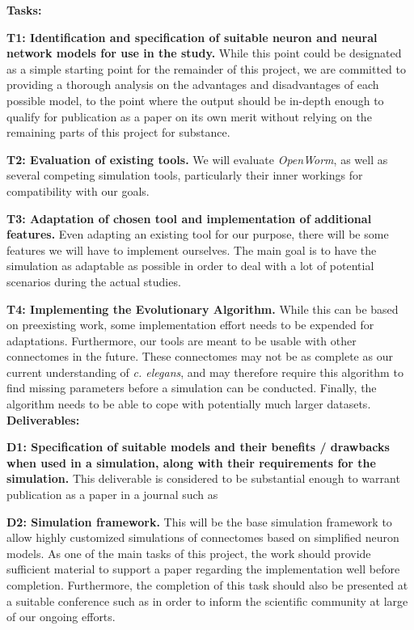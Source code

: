 \documentclass[a4paper,11pt]{article}
\begin{document}
\textbf{Tasks:}

\textbf{T1: Identification and specification of suitable neuron and neural network models for use in the study.}
While this point could be designated as a simple starting point for the remainder of this project, we are committed to providing a thorough analysis on the advantages and disadvantages of each possible model, to the point where the output should be in-depth enough to qualify for publication as a paper on its own merit without relying on the remaining parts of this project for substance.

\textbf{T2: Evaluation of existing tools.}
We will evaluate \emph{OpenWorm}, as well as several competing simulation tools, particularly their inner workings for compatibility with our goals.

\textbf{T3: Adaptation of chosen tool and implementation of additional features.}
Even adapting an existing tool for our purpose, there will be some features we will have to implement ourselves. The main goal is to have the simulation as adaptable as possible in order to deal with a lot of potential scenarios during the actual studies.

\textbf{T4: Implementing the Evolutionary Algorithm.} While this can be based on preexisting work, some implementation effort needs to be expended for adaptations. Furthermore, our tools are meant to be usable with other connectomes in the future. These connectomes may not be as complete as our current understanding of \emph{c. elegans}, and may therefore require this algorithm to find missing parameters before a simulation can be conducted. Finally, the algorithm needs to be able to cope with potentially much larger datasets.
\\[0,2cm]



\textbf{Deliverables:}

\textbf{D1: Specification of suitable models and their benefits / drawbacks when used in a simulation, along with their requirements for the simulation.} This deliverable is considered to be substantial enough to warrant publication as a paper in a journal such as 

\textbf{D2: Simulation framework.} This will be the base simulation framework to allow highly customized simulations of connectomes based on simplified neuron models. As one of the main tasks of this project, the work should provide sufficient material to support a paper regarding the implementation well before completion. Furthermore, the completion of this task should also be presented at a suitable conference such as  in order to inform the scientific community at large of our ongoing efforts.
\end{document}
